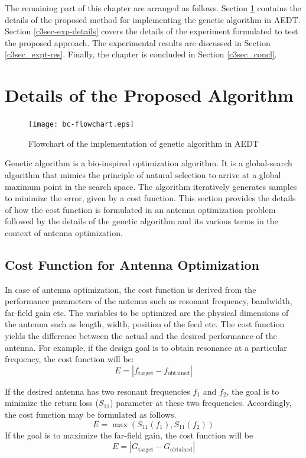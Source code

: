 The remaining part of this chapter are arranged as follows. Section \ref{c3sec-prop-alg} contains the details of the proposed method for implementing the genetic algorithm in AEDT. Section \ref{c3sec-exp-details} covers the details of the experiment formulated to test the proposed approach. The experimental results are discussed in Section \ref{c3sec_expt-res}. Finally, the chapter is concluded in Section \ref{c3sec_concl}.

\section{Details of the Proposed Algorithm} \label{c3sec-prop-alg}
\begin{figure}
  \centering
  \texttt{[image: bc-flowchart.eps]}\\
  \caption{Flowchart of the implementation of genetic algorithm in AEDT}\label{fig1}
\end{figure}
Genetic algorithm is a bio-inspired optimization algorithm. It is a global-search algorithm that mimics the principle of natural selection to arrive at a global maximum point in the search space. The algorithm iteratively generates samples to minimize the error, given by a cost function. This section provides the details of how the cost function is formulated in an antenna optimization problem followed by the details of the genetic algorithm and its various terms in the context of antenna optimization.

\subsection{Cost Function for Antenna Optimization}
In case of antenna optimization, the cost function is derived from the performance parameters of the antenna such as resonant frequency, bandwidth, far-field gain etc. The variables to be optimized are the physical dimensions of the antenna such as length, width, position of the feed etc. The cost function yields the difference between the actual and the desired performance of the antenna. For example, if the design goal is to obtain resonance at a particular frequency, the cost function will be:
\begin{equation}
E = \left|f_{\textrm{target}}-f_{\textrm{obtained}}\right|
\end{equation}

If the desired antenna has two resonant frequencies $f_1$ and $f_2$, the goal is to minimize the return loss ($S_{11}$) parameter at these two frequencies. Accordingly, the cost function may be formulated as follows.
\begin{equation}
E = \max\left(S_{11}(f_1), S_{11}(f_2)\right)
\end{equation}
If the goal is to maximize the far-field gain, the cost function will be
\begin{equation}
E = \left|G_{\textrm{target}}-G_{\textrm{obtained}}\right|
\end{equation}

